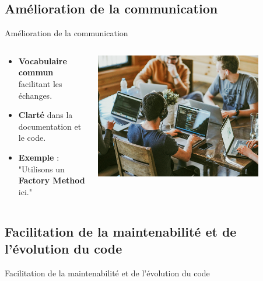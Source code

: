 \documentclass[aspectratio=169]{beamer}
\begin{document}
\subsection{Amélioration de la communication}

\begin{frame}{Amélioration de la communication}
    \begin{columns}
        \begin{column}{0.6\textwidth}
            \begin{itemize}
                \item \textbf{Vocabulaire commun} facilitant les échanges.
                \item \textbf{Clarté} dans la documentation et le code.
                      \pause
                \item \textbf{Exemple} : "Utilisons un \textbf{Factory Method} ici."
            \end{itemize}
        \end{column}
        \begin{column}{0.4\textwidth}
            \begin{center}
                \includegraphics[width=0.8\textwidth]{pic/communication.png}
            \end{center}
        \end{column}
    \end{columns}
\end{frame}

\subsection{Facilitation de la maintenabilité et de l'évolution du code}
    \begin{frame}{Facilitation de la maintenabilité et de l'évolution du code}
    \end{frame}
\end{document}
